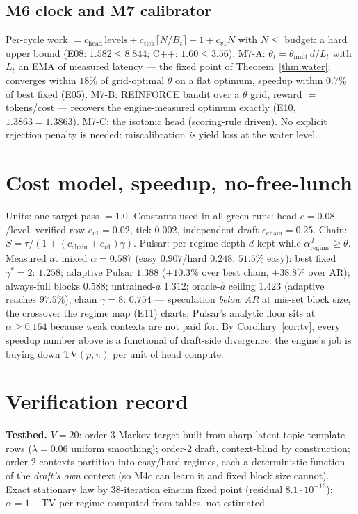 \documentclass[11pt,a4paper]{article}
\theoremstyle{definition}
\begin{document}
\subsection{M6 clock and M7 calibrator}
Per-cycle work $=c_{\text{head}}\,\text{levels}
+c_{\text{tick}}\lceil N/B_t\rceil+1+c_{v1}N$ with $N\le$ budget: a hard
upper bound (E08: $1.582\le8.844$; C++: $1.60\le3.56$).
M7-A: $\theta_t=\theta_{\text{mult}}\,d/L_t$ with
$L_t$ an EMA of measured latency --- the fixed point of
Theorem~\ref{thm:water}; converges within $18\%$ of grid-optimal $\theta$ on
a flat optimum, speedup within $0.7\%$ of best fixed (E05).
M7-B: REINFORCE bandit over a $\theta$ grid, reward $=$ tokens/cost ---
recovers the engine-measured optimum exactly (E10, $1.3863=1.3863$).
M7-C: the isotonic head (scoring-rule driven). No explicit rejection penalty
is needed: miscalibration \emph{is} yield loss at the water level.

\section{Cost model, speedup, no-free-lunch}
\label{sec:cost}
Units: one target pass $=1.0$. Constants used in all green runs:
head $c=0.08$/level, verified-row $c_{v1}=0.02$, tick $0.002$,
independent-draft $c_{\text{chain}}=0.25$.
Chain: $S=\tau/(1+(c_{\text{chain}}+c_{v1})\gamma)$.
Pulsar: per-regime depth $d$ kept while $\alpha_{\text{regime}}^d\ge\theta$.
Measured at mixed $\alpha=0.587$ (easy $0.907$/hard $0.248$, $51.5\%$ easy):
best fixed $\gamma^\ast=2$: $1.258$;
adaptive Pulsar $1.388$ ($+10.3\%$ over best chain, $+38.8\%$ over AR);
always-full blocks $0.588$; untrained-$\hat a$ $1.312$;
oracle-$\hat a$ ceiling $1.423$ (adaptive reaches $97.5\%$);
chain $\gamma=8$: $0.754$ --- speculation \emph{below AR} at mis-set block
size, the crossover the regime map (E11) charts; Pulsar's analytic floor sits
at $\alpha\ge0.164$ because weak contexts are not paid for.
By Corollary~\ref{cor:tv}, every speedup number above is a functional of
draft-side divergence: the engine's job is buying down
$\mathrm{TV}(p,\pi)$ per unit of head compute.

\section{Verification record}
\label{sec:verify}
\textbf{Testbed.} $V=20$: order-3 Markov target built from sharp latent-topic
template rows ($\lambda=0.06$ uniform smoothing); order-2 draft,
context-blind by construction; order-2 contexts partition into easy/hard
regimes, each a deterministic function of the \emph{draft's own} context
(so M4c can learn it and fixed block size cannot). Exact stationary law by
38-iteration einsum fixed point (residual $8.1\cdot10^{-16}$);
$\alpha=1-\mathrm{TV}$ per regime computed from tables, not estimated.
\end{document}
